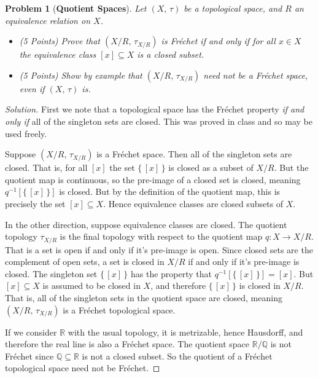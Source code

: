 \documentclass{article}
\theoremstyle{normal}
\newtheorem{problem}{Problem}
\begin{document}
    \newpage
    \color{blue}
    \begin{problem}[\textbf{Quotient Spaces}]
        \par\hfill\par
        Let $(X,\,\tau)$ be a topological space, and $R$ an equivalence
        relation on $X$.
        \begin{itemize}
            \item (5 Points) Prove that $(X/R,\,\tau_{X/R})$ is Fr\'{e}chet
                if and only if for all $x\in{X}$ the equivalence class
                $[x]\subseteq{X}$ is a closed subset.
            \item (5 Points) Show by example that $(X/R,\,\tau_{X/R})$ need not
                be a Fr\'{e}chet space, even if $(X,\,\tau)$ is.
        \end{itemize}
    \end{problem}
    \color{black}
    \begin{proof}[Solution]
        First we note that a topological space has the Fr\'{e}chet property
        \textit{if and only if} all of the singleton sets are closed. This was
        proved in class and so may be used freely.
        \par\hfill\par
        Suppose $(X/R,\,\tau_{X/R})$ is a Fr\'{e}chet space. Then all of the
        singleton sets are closed. That is, for all $[x]$ the set
        $\{\,[x]\,\}$ is closed as a subset of $X/R$. But the quotient map is
        continuous, so the pre-image of a closed set is closed, meaning
        $q^{-1}[\{\,[x]\,\}]$ is closed. But by the definition of the quotient
        map, this is precisely the set $[x]\subseteq{X}$. Hence equivalence
        classes are closed subsets of $X$.
        \par\hfill\par
        In the other direction, suppose equivalence classes are closed. The
        quotient topology $\tau_{X/R}$ is the final topology with respect to
        the quotient map $q:X\rightarrow{X}/R$. That is a set is open if and
        only if it's pre-image is open. Since closed sets are the complement of
        open sets, a set is closed in $X/R$ if and only if it's pre-image is
        closed. The singleton set $\{\,[x]\,\}$ has the property that
        $q^{-1}[\{\,[x]\,\}]=[x]$. But $[x]\subseteq{X}$ is assumed to be
        closed in $X$, and therefore $\{\,[x]\,\}$ is closed in $X/R$. That is,
        all of the singleton sets in the quotient space are closed, meaning
        $(X/R,\,\tau_{X/R})$ is a Fr\'{e}chet topological space.
        \par\hfill\par
        If we consider $\mathbb{R}$ with the usual topology, it is metrizable,
        hence Hausdorff, and therefore the real line is also a Fr\'{e}chet
        space. The quotient space $\mathbb{R}/\mathbb{Q}$ is not Fr\'{e}chet
        since $\mathbb{Q}\subseteq\mathbb{R}$ is not a closed subset. So the
        quotient of a Fr\'{e}chet topological space need not be Fr\'{e}chet.
    \end{proof}
    \newpage
    \color{blue}
\end{document}
